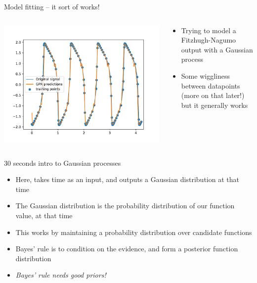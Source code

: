 \documentclass[presentation]{beamer}
\begin{document}
\begin{frame}[label={sec:org06671a7}]{Model fitting -- it sort of works!}
\begin{columns}
\begin{column}{0.6\columnwidth}
\begin{center}
\includegraphics[height=.85\textheight]{./gpr1.pdf}
\end{center}
\end{column}

\begin{column}{0.4\columnwidth}
\begin{itemize}
\item Trying to model a Fitzhugh-Nagumo output with a Gaussian process
\item Some wiggliness between datapoints (more on that later!) but it generally works
\end{itemize}
\end{column}
\end{columns}
\end{frame}

\begin{frame}[label={sec:org05c7433}]{30 seconds intro to Gaussian processes}
\begin{itemize}
\item Here, takes time as an input, and outputs a Gaussian distribution at that time
\item The Gaussian distribution is the probability distribution of our function value, at that time
\item This works by maintaining a probability distribution over candidate functions
\item Bayes' rule is to condition on the evidence, and form a posterior function distribution
\item \emph{Bayes' rule needs good priors!}
\end{itemize}
\end{frame}
\end{document}
